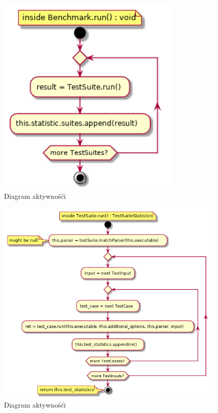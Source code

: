 \documentclass[a4paper,12pt]{article}
\begin{document}
\begin{figure}[H]
  \centering
  \includegraphics[width=0.8\textwidth]{benchmark/activity_diagrams/benchmark_run.png}
  \caption{Diagram aktywnośći}
\end{figure}

\begin{figure}[H]
  \centering
  \includegraphics[width=\textwidth]{benchmark/activity_diagrams/test_suite_run.png}
  \caption{Diagram aktywnośći}
\end{figure}
\end{document}
